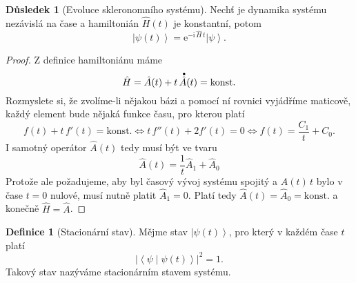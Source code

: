 \documentclass[10pt,a4paper]{report}
\theoremstyle{definition}
\newtheorem{definition}[theorem]{Definice}
\newtheorem{corollary}[theorem]{Důsledek}
\newcommand{\const}[1]{\mathrm{#1}}
\newcommand{\abs}[1]{\left| #1 \right|}
\newcommand{\ket}[1]{\left| #1 \right>}
\newcommand{\braket}[2]{\left< #1 \middle| #2 \right>}
\newcommand{\e}[1]{\const{e}^{#1}}
\newcommand{\I}{\const{i}}
\newcommand{\bigdot}[1]{\accentset{\bullet}{#1}}
\def\konst{\mathrm{konst.}}
\begin{document}
\begin{corollary}[Evoluce skleronomního systému]
    \label{evoluce-skleronomniho-systemu}
    Nechť je dynamika systému nezávislá na čase a hamiltonián $\hat H(t)$ je konstantní, potom
    \begin{equation*}
        \ket{\psi(t)} = \e{-\I \, \hat{H} \, t} \ket{\psi}.
    \end{equation*}
\end{corollary}
\begin{proof}
    Z definice hamiltoniánu máme
    \begin{equation*}
        \hat H = \hat A(t) + t \, \bigdot{\hat A}(t) = \konst
    \end{equation*}
    Rozmyslete si, že zvolíme-li nějakou bázi a pomocí ní rovnici vyjádříme maticově, každý element bude nějaká funkce času, pro kterou platí
    \begin{equation*}
        f(t) + t \, f'(t) = \konst
        \iff
        t \, f''(t) + 2 f'(t) = 0
        \iff
        f(t) = \frac{C_1}{t} + C_0.
    \end{equation*}
    I samotný operátor $\hat A(t)$ tedy musí být ve tvaru
    \begin{equation*}
        \hat A(t) = \frac{1}{t} \hat A_1 + \hat A_0
    \end{equation*}
    Protože ale požadujeme, aby byl časový vývoj systému spojitý a $\hat A(t) \, t$ bylo v čase $t=0$ nulové, musí nutně platit $\hat A_1 = 0$. Platí tedy $\hat A(t) = \hat A_0 = \konst$ a konečně $\hat H = \hat A$.
\end{proof}

\begin{definition}[Stacionární stav]
    Mějme stav $\ket{\psi(t)}$, pro který v každém čase $t$ platí
    \begin{equation*}
        \abs{\braket{\psi}{\psi(t)}}^2 = 1.
    \end{equation*}
    Takový stav nazýváme stacionárním stavem systému.
\end{definition}
\end{document}
